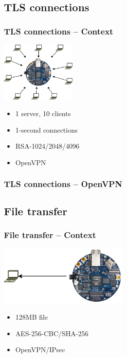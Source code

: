 \documentclass[xcolor={x11names, rgb, usenames, dvipsnames}]{beamer}
\newcommand\Wider[2][3em]{%
\makebox[\linewidth][c]{%
  \begin{minipage}{\dimexpr\textwidth+#1\relax}
  \raggedright#2
  \end{minipage}%
  }%
}
\begin{document}
\subsection{TLS connections}

\begin{frame}
\frametitle{TLS connections -- Context}
\begin{center}
\includegraphics[height=3cm]{tls-bench.png}
\end{center}
\begin{itemize}
	\item 1 server, 10 clients
	\item 1-second connections
	\item RSA-1024/2048/4096
	\item OpenVPN
\end{itemize}
\end{frame}

\begin{frame}
\frametitle{TLS connections -- OpenVPN}
\Wider[1em]{%
	\begin{minipage}[c]{.48\linewidth}
		\begin{tikzpicture}
		
		\end{tikzpicture}
	\end{minipage} \hfill
	\begin{minipage}[c]{.44\linewidth}
		\begin{tikzpicture}
		
		\end{tikzpicture}
		\vspace{0.5cm}
	\end{minipage}
}
\end{frame}


\subsection{File transfer}

\begin{frame}
\frametitle{File transfer -- Context}
\begin{center}
\includegraphics[height=3cm]{ftp-bench.png}
\end{center}
\begin{itemize}
	\item 128MB file
	\item AES-256-CBC/SHA-256
	\item OpenVPN/IPsec
\end{itemize}
\end{frame}
\end{document}
